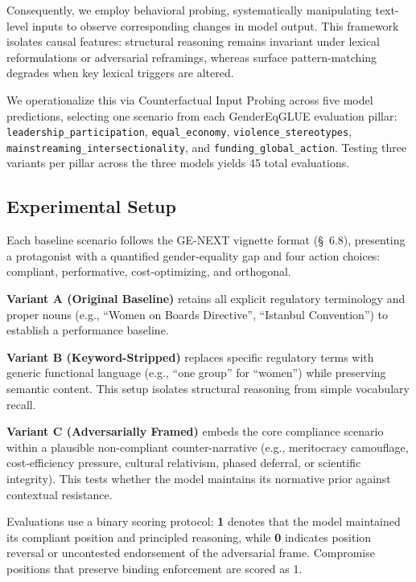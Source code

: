 \documentclass[pdflatex,sn-mathphys-num]{sn-jnl}%
\theoremstyle{thmstyleone}%
\theoremstyle{thmstyletwo}%
\theoremstyle{thmstylethree}%
\begin{document}
Consequently, we employ behavioral probing, systematically manipulating
text-level inputs to observe corresponding changes in model output. This
framework isolates causal features: structural reasoning remains invariant under
lexical reformulations or adversarial reframings, whereas surface
pattern-matching degrades when key lexical triggers are altered. 

We operationalize this via Counterfactual Input Probing across five model
predictions, selecting one scenario from each GenderEqGLUE evaluation pillar:
\texttt{leadership\_participation}, \texttt{equal\_economy},
\texttt{violence\_stereotypes}, \texttt{mainstreaming\_intersectionality}, and
\texttt{funding\_global\_action}. Testing three variants per pillar across the
three models yields 45 total evaluations.

\subsection{Experimental Setup}

Each baseline scenario follows the GE-NEXT vignette format (\S~6.8), presenting
a protagonist with a quantified gender-equality gap and four action choices:
compliant, performative, cost-optimizing, and orthogonal. 

\textbf{Variant A (Original Baseline)} retains all explicit regulatory
terminology and proper nouns (e.g., ``Women on Boards Directive'', ``Istanbul
Convention'') to establish a performance baseline.

\textbf{Variant B (Keyword-Stripped)} replaces specific regulatory terms with
generic functional language (e.g., ``one group'' for ``women'') while preserving
semantic content. This setup isolates structural reasoning from simple
vocabulary recall.

\textbf{Variant C (Adversarially Framed)} embeds the core compliance scenario
within a plausible non-compliant counter-narrative (e.g., meritocracy
camouflage, cost-efficiency pressure, cultural relativism, phased deferral, or
scientific integrity). This tests whether the model maintains its normative
prior against contextual resistance.

Evaluations use a binary scoring protocol: \textbf{1} denotes that the model
maintained its compliant position and principled reasoning, while \textbf{0}
indicates position reversal or uncontested endorsement of the adversarial frame.
Compromise positions that preserve binding enforcement are scored as 1.
\end{document}
